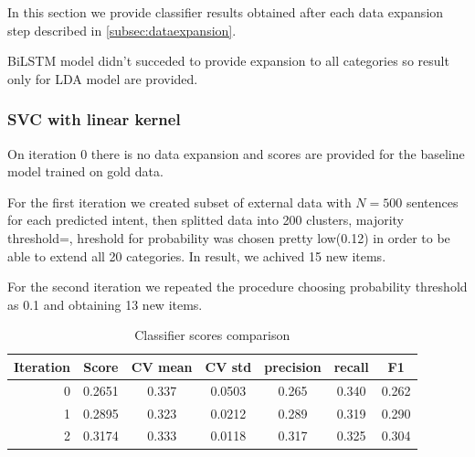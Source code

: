 \documentclass[11pt]{article}
\begin{document}
In this section we provide classifier results obtained after each data expansion step described in  \ref{subsec:dataexpansion}.

BiLSTM model didn't succeded to provide expansion to all categories so result only for LDA model are provided.


  
\subsubsection{SVC with linear kernel}
  
On iteration 0 there is no data expansion and scores are provided for the baseline model trained on gold data.

For the first iteration we created subset of external data with $N=500$ sentences for each predicted intent, then splitted data into 200 clusters, majority threshold=, hreshold for probability was chosen pretty low(0.12) in order to be able to extend all 20 categories. In result, we achived 15 new items.


For the second iteration we repeated the procedure choosing probability threshold as 0.1 and obtaining 13 new items.


\begin{table}[htb]
\begin{center}
\begin{tabular}{ |r|c|c|c|c|c|c| }
\hline
Iteration 	& Score  & CV mean & CV std & precision & recall & F1 \\ \hline
0			& 0.2651 & 0.337   & 0.0503 & 0.265 	& 0.340  & 0.262 \\ \hline
1			& 0.2895 & 0.323   & 0.0212 & 0.289 	& 0.319  & 0.290 \\ \hline
2 			& 0.3174 & 0.333   & 0.0118 & 0.317 	& 0.325  & 0.304 \\ \hline
\end{tabular}
\caption{Classifier scores comparison}
\end{center}
\end{table}
\FloatBarrier
\end{document}
